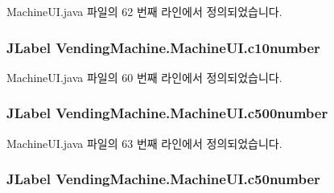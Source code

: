 Machine\+U\+I.\+java 파일의 62 번째 라인에서 정의되었습니다.

\subsubsection[{\texorpdfstring{c10number}{c10number}}]{\setlength{\rightskip}{0pt plus 5cm}J\+Label Vending\+Machine.\+Machine\+U\+I.\+c10number\hspace{0.3cm}{\ttfamily [private]}}\hypertarget{class_vending_machine_1_1_machine_u_i_a87030fea4819a0534fe536af2084a6e5}{}\label{class_vending_machine_1_1_machine_u_i_a87030fea4819a0534fe536af2084a6e5}


Machine\+U\+I.\+java 파일의 60 번째 라인에서 정의되었습니다.

\subsubsection[{\texorpdfstring{c500number}{c500number}}]{\setlength{\rightskip}{0pt plus 5cm}J\+Label Vending\+Machine.\+Machine\+U\+I.\+c500number\hspace{0.3cm}{\ttfamily [private]}}\hypertarget{class_vending_machine_1_1_machine_u_i_ab6f47810cb959c1353a04f8aba54ae21}{}\label{class_vending_machine_1_1_machine_u_i_ab6f47810cb959c1353a04f8aba54ae21}


Machine\+U\+I.\+java 파일의 63 번째 라인에서 정의되었습니다.

\subsubsection[{\texorpdfstring{c50number}{c50number}}]{\setlength{\rightskip}{0pt plus 5cm}J\+Label Vending\+Machine.\+Machine\+U\+I.\+c50number\hspace{0.3cm}{\ttfamily [private]}}\hypertarget{class_vending_machine_1_1_machine_u_i_a41f6d6db82cc6d27f2961c71d8fff229}{}\label{class_vending_machine_1_1_machine_u_i_a41f6d6db82cc6d27f2961c71d8fff229}


